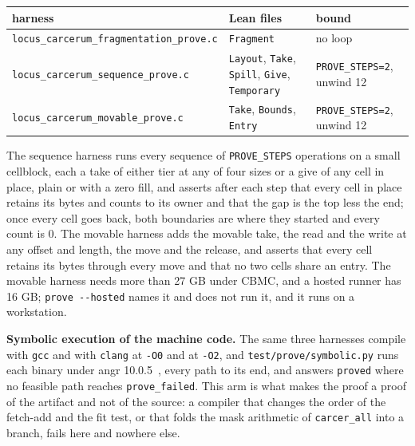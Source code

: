 {\small
\setlength{\tabcolsep}{6pt}
\begin{longtable}{>{\RaggedRight\arraybackslash}p{}>{\RaggedRight\arraybackslash}p{}>{\RaggedRight\arraybackslash}p{}}
\toprule
harness & Lean files & bound \\
\midrule
\endhead
\texttt{locus\_\allowbreak{}carcerum\_\allowbreak{}fragmentation\_\allowbreak{}prove.\allowbreak{}c} & \texttt{Fragment} & no loop \\
\texttt{locus\_\allowbreak{}carcerum\_\allowbreak{}sequence\_\allowbreak{}prove.\allowbreak{}c} & \texttt{Layout}, \texttt{Take}, \texttt{Spill}, \texttt{Give}, \texttt{Temporary} & \texttt{PROVE\_\allowbreak{}STEPS=2}, unwind 12 \\
\texttt{locus\_\allowbreak{}carcerum\_\allowbreak{}movable\_\allowbreak{}prove.\allowbreak{}c} & \texttt{Take}, \texttt{Bounds}, \texttt{Entry} & \texttt{PROVE\_\allowbreak{}STEPS=2}, unwind 12 \\
\bottomrule
\end{longtable}
}

The sequence harness runs every sequence of \texttt{PROVE\_\allowbreak{}STEPS} operations on a small cellblock, each a take of either tier at any of four sizes or a give of any cell in place, plain or with a zero fill, and asserts after each step that every cell in place retains its bytes and counts to its owner and that the gap is the top less the end; once every cell goes back, both boundaries are where they started and every count is 0. The movable harness adds the movable take, the read and the write at any offset and length, the move and the release, and asserts that every cell retains its bytes through every move and that no two cells share an entry. The movable harness needs more than 27 GB under CBMC, and a hosted runner has 16 GB; \texttt{prove -\allowbreak{}-\allowbreak{}hosted} names it and does not run it, and it runs on a workstation.

\textbf{Symbolic execution of the machine code.} The same three harnesses compile with \texttt{gcc} and with \texttt{clang} at \texttt{-\allowbreak{}O0} and at \texttt{-\allowbreak{}O2}, and \texttt{test/\allowbreak{}prove/\allowbreak{}symbolic.\allowbreak{}py} runs each binary under angr 10.0.5~\cite{src:angr}, every path to its end, and answers \texttt{proved} where no feasible path reaches \texttt{prove\_\allowbreak{}failed}. This arm is what makes the proof a proof of the artifact and not of the source: a compiler that changes the order of the fetch-add and the fit test, or that folds the mask arithmetic of \texttt{carcer\_\allowbreak{}all} into a branch, fails here and nowhere else.

